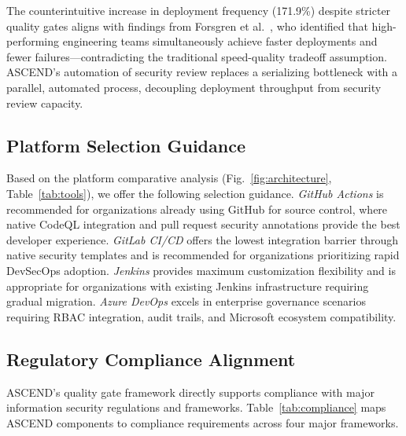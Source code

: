 \documentclass[journal]{IEEEtran}
\begin{document}
The counterintuitive increase in deployment frequency (171.9\%) despite stricter quality gates aligns with findings from Forsgren et al.~\cite{forsgren2018}, who identified that high-performing engineering teams simultaneously achieve faster deployments and fewer failures---contradicting the traditional speed-quality tradeoff assumption. ASCEND's automation of security review replaces a serializing bottleneck with a parallel, automated process, decoupling deployment throughput from security review capacity.

\subsection{Platform Selection Guidance}

Based on the platform comparative analysis (Fig.~\ref{fig:architecture}, Table~\ref{tab:tools}), we offer the following selection guidance. \textit{GitHub Actions} is recommended for organizations already using GitHub for source control, where native CodeQL integration and pull request security annotations provide the best developer experience. \textit{GitLab CI/CD} offers the lowest integration barrier through native security templates and is recommended for organizations prioritizing rapid DevSecOps adoption. \textit{Jenkins} provides maximum customization flexibility and is appropriate for organizations with existing Jenkins infrastructure requiring gradual migration. \textit{Azure DevOps} excels in enterprise governance scenarios requiring RBAC integration, audit trails, and Microsoft ecosystem compatibility.

\subsection{Regulatory Compliance Alignment}

ASCEND's quality gate framework directly supports compliance with major information security regulations and frameworks. Table~\ref{tab:compliance} maps ASCEND components to compliance requirements across four major frameworks.
\end{document}
